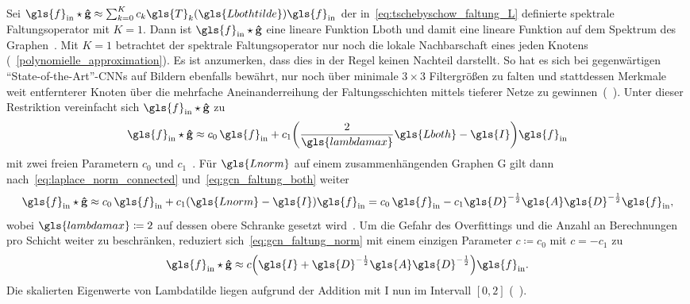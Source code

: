 Sei $\gls{f}_{\mathrm{in}} \star \ve{\hat g} \approx \sum_{k=0}^K c_k \gls{T}_k\left(\gls{Lbothtilde}\right) \gls{f}_{\mathrm{in}}$ der in~\eqref{eq:tschebyschow_faltung_L} definierte spektrale Faltungsoperator mit $K=1$.
Dann ist $\gls{f}_{\mathrm{in}} \star \ve{\hat g}$ eine lineare Funktion \bzgl{} \gls{Lboth} und damit eine lineare Funktion auf dem Spektrum des Graphen~\cite{gcn}.
Mit $K=1$ betrachtet der spektrale Faltungsoperator nur noch die lokale Nachbarschaft eines jeden Knotens (\vgl{}~\ref{polynomielle_approximation}).
Es ist anzumerken, dass dies in der Regel keinen Nachteil darstellt.
So hat es sich bei gegenwärtigen \enquote{State-of-the-Art}-\glspl{CNN} auf Bildern ebenfalls bewährt, nur noch über minimale $3\times3$ Filtergrößen zu falten und stattdessen Merkmale weit entfernterer Knoten über die mehrfache Aneinanderreihung der Faltungsschichten mittels tieferer Netze zu gewinnen~(\vgl{}~\cite{gcn, vgg, He}).
Unter dieser Restriktion vereinfacht sich $\gls{f}_{\mathrm{in}} \star \ve{\hat g}$ zu
\begin{equation}
  \gls{f}_{\mathrm{in}} \star \ve{\hat g} \approx c_0\, \gls{f}_{\mathrm{in}} + c_1 \left(\frac{2}{\gls{lambdamax}}\gls{Lboth} - \gls{I}\right)\gls{f}_{\mathrm{in}}
  \label{eq:gcn_faltung_both}
\end{equation}
mit zwei freien Parametern $c_0$ und $c_1$~\cite{gcn}.
Für $\gls{Lnorm}$ auf einem zusammenhängenden Graphen \gls{G} gilt dann nach~\eqref{eq:laplace_norm_connected} und~\eqref{eq:gcn_faltung_both} weiter
\begin{equation}
  \gls{f}_{\mathrm{in}} \star \ve{\hat g} \approx c_0 \, \gls{f}_{\mathrm{in}} + c_1 \left(\gls{Lnorm} - \gls{I}\right)\gls{f}_{\mathrm{in}} = c_0 \, \gls{f}_{\mathrm{in}} - c_1 \gls{D}^{-\frac{1}{2}} \gls{A} \gls{D}^{-\frac{1}{2}} \gls{f}_{\mathrm{in}},
  \label{eq:gcn_faltung_norm}
\end{equation}
wobei $\gls{lambdamax} \coloneqq 2$ auf dessen obere Schranke gesetzt wird~\cite{gcn}.
Um die Gefahr des Overfittings und die Anzahl an Berechnungen pro Schicht weiter zu beschränken, reduziert sich~\eqref{eq:gcn_faltung_norm} mit einem einzigen Parameter $c \coloneqq c_0$ mit $c = -c_1$ zu~\cite{gcn}
\begin{equation*}
  \gls{f}_{\mathrm{in}} \star \ve{\hat g} \approx c \left(\gls{I} + \gls{D}^{-\frac{1}{2}} \gls{A} \gls{D}^{-\frac{1}{2}} \right) \gls{f}_{\mathrm{in}}.
\end{equation*}
Die skalierten Eigenwerte von \gls{Lambdatilde} liegen aufgrund der Addition mit \gls{I} nun im Intervall $\left[0, 2\right]$ (\vgl{}~\cite{gcn}).
